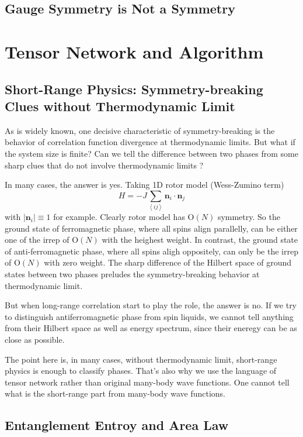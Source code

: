 \documentclass[10pt,nofootinbib]{revtex4}
\begin{document}
	\subsection{Gauge Symmetry is Not a Symmetry}


\section{Tensor Network and Algorithm}
	\subsection{Short-Range Physics: Symmetry-breaking Clues without Thermodynamic Limit}
		As is widely known, one decisive characteristic of symmetry-breaking is the behavior of correlation function divergence at thermodynamic limits. But what if the system size is finite? Can we tell the difference between two phases from some sharp clues that do not involve thermodynamic limits \cite{jiang2015symmetric} ?\par
		In many cases, the answer is yes. Taking 1D rotor model (Wess-Zumino term)
		\begin{equation*}
			H=-J\sum_{\left\langle ij\right\rangle}\bm{n}_i\cdot\bm{n}_j
		\end{equation*}
		with $|\bm{n}_i|\equiv1$ for example. Clearly rotor model has $\mathrm{O}(N)$ symmetry. So the ground state of ferromagnetic phase, where all spins align parallelly, can be either one of the irrep of $\mathrm{O}(N)$ with the heighest weight. In contrast, the ground state of anti-ferromagnetic phase, where all spins aligh oppositely, can only be the irrep of $\mathrm{O}(N)$ with zero weight. The sharp difference of the Hilbert space of ground states between two phases preludes the symmetry-breaking behavior at thermodynamic limit.\par
		But when long-range correlation start to play the role, the answer is no. If we try to distinguish antiferromagnetic phase from spin liquids, we cannot tell anything from their Hilbert space as well as energy spectrum, since their eneregy can be as close as possible.\par
		The point here is, in many cases, without thermodynamic limit, short-range physics is enough to classify phases. That's also why we use the language of tensor network rather than original many-body wave functions. One cannot tell what is the short-range part from many-body wave functions.

	\subsection{Entanglement Entroy and Area Law}
\end{document}
